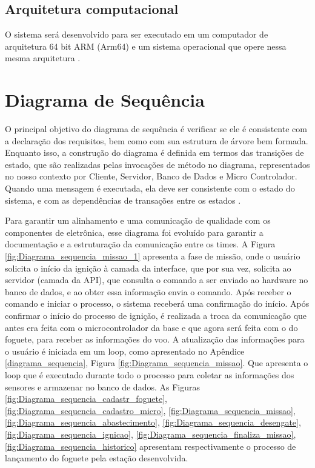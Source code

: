 \subsection{Arquitetura computacional}

\par O sistema será desenvolvido para ser executado em um computador de arquitetura 64 bit ARM (Arm64) e um sistema operacional que opere nessa mesma arquitetura \cite{arquitetura_arm}.

\section{Diagrama de Sequência}

\par O principal objetivo do diagrama de sequência é verificar se ele é consistente com a declaração dos requisitos, bem como com sua estrutura de árvore bem formada. Enquanto isso, a construção do diagrama é definida em termos das transições de estado, que são realizadas pelas invocações de método no diagrama, representados no nosso contexto por Cliente, Servidor, Banco de Dados e Micro Controlador. Quando uma mensagem é executada, ela deve ser consistente com o estado do sistema, e com as dependências de transações entre os estados \cite{li2004formal}.

\par Para garantir um alinhamento e uma comunicação de qualidade com os componentes de eletrônica, esse diagrama foi evoluído para garantir a documentação e a estruturação da comunicação entre os times. A Figura \ref{fig:Diagrama_sequencia_missao_1} apresenta a fase de missão, onde o usuário solicita o início da ignição à camada da interface, que por sua vez, solicita ao servidor (camada da API), que consulta o comando a ser enviado ao hardware no banco de dados, e ao obter essa informação envia o comando. Após receber o comando e iniciar o processo, o sistema receberá uma confirmação do início. Após confirmar o início do processo de ignição, é realizada a troca da comunicação que antes era feita com o microcontrolador da base e que agora será feita com o do foguete, para receber as informações do voo. A atualização das informações para o usuário é iniciada em um loop, como apresentado no Apêndice \ref{diagrama_sequencia}, Figura \ref{fig:Diagrama_sequencia_missao}. Que apresenta o loop que é executado durante todo o processo para coletar as informações dos sensores e armazenar no banco de dados. As Figuras \ref{fig:Diagrama_sequencia_cadastr_foguete}, \ref{fig:Diagrama_sequencia_cadastro_micro}, \ref{fig:Diagrama_sequencia_missao}, \ref{fig:Diagrama_sequencia_abastecimento}, \ref{fig:Diagrama_sequencia_desengate}, \ref{fig:Diagrama_sequencia_ignicao}, \ref{fig:Diagrama_sequencia_finaliza_missao}, \ref{fig:Diagrama_sequencia_historico} apresentam respectivamente o processo de lançamento do foguete pela estação desenvolvida.


